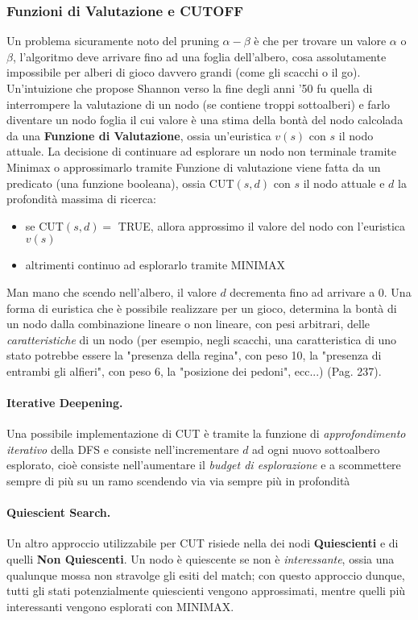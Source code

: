\subsubsection{Funzioni di Valutazione e CUTOFF}
Un problema sicuramente noto del pruning $\alpha-\beta$ è che per trovare un valore $\alpha$ o $\beta$, l'algoritmo deve arrivare fino ad una foglia
dell'albero, cosa assolutamente impossibile per alberi di gioco davvero grandi (come gli scacchi o il go). Un'intuizione che propose Shannon
verso la fine degli anni '50 fu quella di interrompere la valutazione di un nodo (se contiene troppi sottoalberi) e farlo diventare un nodo foglia
il cui valore è una stima della bontà del nodo calcolada da una \textbf{Funzione di Valutazione}, ossia un'euristica $v(s)$ con $s$ il nodo attuale.
La decisione di continuare ad esplorare un nodo non terminale tramite Minimax o approssimarlo tramite Funzione di valutazione viene fatta da un predicato 
(una funzione booleana), ossia CUT$(s,d)$ con $s$ il nodo attuale e $d$ la profondità massima di ricerca:
\begin{itemize}
    \item se CUT$(s,d) = $ TRUE, allora approssimo il valore del nodo con l'euristica $v(s)$
    \item altrimenti continuo ad esplorarlo tramite MINIMAX
\end{itemize}
Man mano che scendo nell'albero, il valore $d$ decrementa fino ad arrivare a $0$.
Una forma di euristica che è possibile realizzare per un gioco, determina la bontà di un nodo dalla combinazione lineare o non lineare, con pesi arbitrari, delle \textit{caratteristiche}
di un nodo (per esempio, negli scacchi, una caratteristica di uno stato potrebbe essere la "presenza della regina", con peso 10, la "presenza di entrambi gli alfieri", con peso 6, la "posizione dei pedoni", ecc...) (Pag. 237).

\paragraph{Iterative Deepening.} Una possibile implementazione di CUT è tramite la funzione di \textit{approfondimento iterativo} della DFS e consiste nell'incrementare $d$
ad ogni nuovo sottoalbero esplorato, cioè consiste nell'aumentare il \textit{budget di esplorazione} e a scommettere sempre di più su un ramo scendendo via via sempre più in profondità

\paragraph{Quiescient Search.} Un altro approccio utilizzabile per CUT risiede nella dei nodi \textbf{Quiescienti} e di quelli \textbf{Non Quiescenti}.
Un nodo è quiescente se non è \textit{interessante}, ossia una qualunque mossa non stravolge gli esiti del match; con questo approccio dunque, tutti gli stati potenzialmente quiescienti vengono approssimati,
mentre quelli più interessanti vengono esplorati con MINIMAX.
